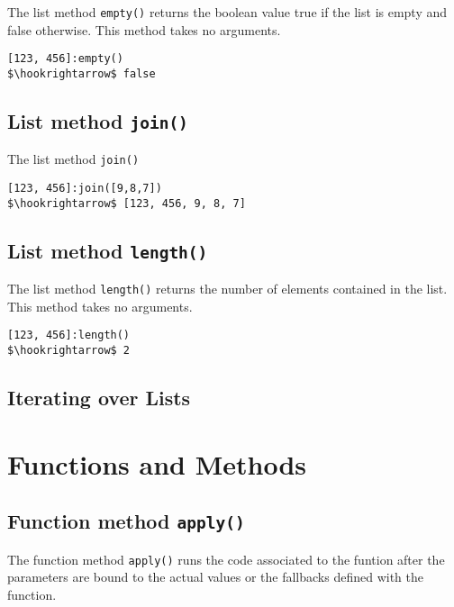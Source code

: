 \documentclass[11pt,a4paper]{scrbook}
\begin{document}
The list method \texttt{empty()} returns the boolean value true if the list is
empty and false otherwise. This method takes no arguments.

\begin{lstlisting}[language=BibTool,mathescape=true]
[123, 456]:empty()
$\hookrightarrow$ false
\end{lstlisting}

\subsection{List method \texttt{join()}}

The list method \texttt{join()}

\begin{lstlisting}[language=BibTool,mathescape=true]
[123, 456]:join([9,8,7])
$\hookrightarrow$ [123, 456, 9, 8, 7]
\end{lstlisting}

\subsection{List method \texttt{length()}}

The list method \texttt{length()} returns the number of elements contained in
the list. This method takes no arguments.

\begin{lstlisting}[language=BibTool,mathescape=true]
[123, 456]:length()
$\hookrightarrow$ 2
\end{lstlisting}

\subsection{Iterating over Lists}


\section{Functions and Methods}



\subsection{Function method \texttt{apply()}}

The function method \texttt{apply()} runs the code associated to the funtion
after the parameters are bound to the actual values or the fallbacks defined
with the function.
\end{document}
